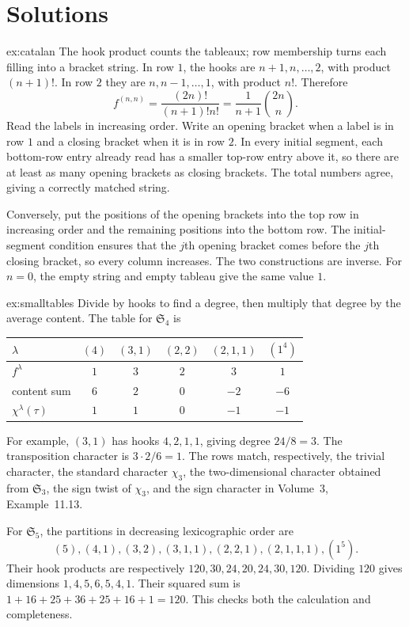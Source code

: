 \section{Solutions}

\begin{solution}{ex:catalan}
\idea The hook product counts the tableaux; row membership turns each filling into a bracket string.
\writeup In row $1$, the hooks are $n+1,n,\ldots,2$, with product $(n+1)!$. In row $2$ they are $n,n-1,\ldots,1$, with product $n!$. Therefore
\[
f^{(n,n)}=\frac{(2n)!}{(n+1)!n!}=\frac1{n+1}\binom{2n}n.
\]
Read the labels in increasing order. Write an opening bracket when a label is in row $1$ and a closing bracket when it is in row $2$. In every initial segment, each bottom-row entry already read has a smaller top-row entry above it, so there are at least as many opening brackets as closing brackets. The total numbers agree, giving a correctly matched string.

Conversely, put the positions of the opening brackets into the top row in increasing order and the remaining positions into the bottom row. The initial-segment condition ensures that the $j$th opening bracket comes before the $j$th closing bracket, so every column increases. The two constructions are inverse. For $n=0$, the empty string and empty tableau give the same value $1$.
\end{solution}

\begin{solution}{ex:smalltables}
\idea Divide by hooks to find a degree, then multiply that degree by the average content.
\writeup The table for $\mathfrak S_4$ is
\begin{center}
\begin{tabular}{@{}lccccc@{}}
$\lambda$&$(4)$&$(3,1)$&$(2,2)$&$(2,1,1)$&$(1^4)$\\\hline
$f^\lambda$&$1$&$3$&$2$&$3$&$1$\\
content sum&$6$&$2$&$0$&$-2$&$-6$\\
$\chi^\lambda(\tau)$&$1$&$1$&$0$&$-1$&$-1$
\end{tabular}
\end{center}
For example, $(3,1)$ has hooks $4,2,1,1$, giving degree $24/8=3$. The transposition character is $3\cdot2/6=1$. The rows match, respectively, the trivial character, the standard character $\chi_3$, the two-dimensional character obtained from $\mathfrak S_3$, the sign twist of $\chi_3$, and the sign character in Volume~3, Example~11.13.

For $\mathfrak S_5$, the partitions in decreasing lexicographic order are
\[
(5),(4,1),(3,2),(3,1,1),(2,2,1),(2,1,1,1),(1^5).
\]
Their hook products are respectively $120,30,24,20,24,30,120$. Dividing $120$ gives dimensions $1,4,5,6,5,4,1$. Their squared sum is $1+16+25+36+25+16+1=120$. This checks both the calculation and completeness.
\end{solution}

